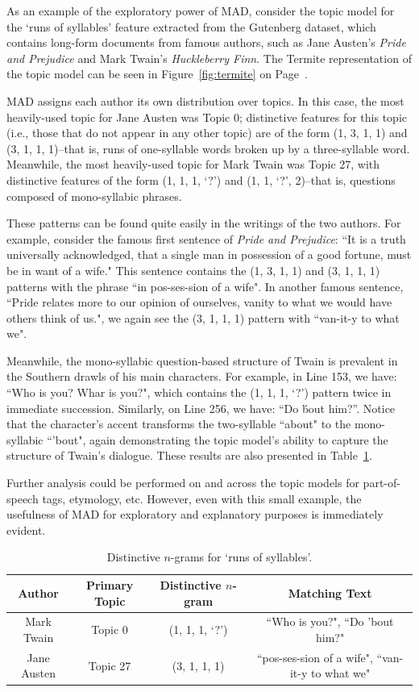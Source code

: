 \documentclass[14pt]{article} %
\theoremstyle{plain}
\theoremstyle{definition}
\theoremstyle{remark}
\begin{document}
As an example of the exploratory power of MAD, consider the topic model for the `runs of syllables' feature extracted from the Gutenberg dataset, which contains long-form documents from famous authors, such as Jane Austen's \textit{Pride and Prejudice} and Mark Twain's \textit{Huckleberry Finn}. The Termite representation of the topic model can be seen in Figure~\ref{fig:termite} on Page~\pageref{fig:termite}.

MAD assigns each author its own distribution over topics. In this case, the most heavily-used topic for Jane Austen was Topic 0; distinctive features for this topic (i.e., those that do not appear in any other topic) are of the form (1, 3, 1, 1) and (3, 1, 1, 1)--that is, runs of one-syllable words broken up by a three-syllable word. Meanwhile, the most heavily-used topic for Mark Twain was Topic 27, with distinctive features of the form (1, 1, 1, `?') and (1, 1, `?', 2)--that is, questions composed of mono-syllabic phrases.

These patterns can be found quite easily in the writings of the two authors. For example, consider the famous first sentence of \textit{Pride and Prejudice}: ``It is a truth universally acknowledged, that a single man in possession of a good fortune, must be in want of a wife." This sentence contains the (1, 3, 1, 1) and (3, 1, 1, 1) patterns with the phrase ``in pos-ses-sion of a wife". In another famous sentence, ``Pride relates more to our opinion of ourselves, vanity to what we would have others think of us.", we again see the (3, 1, 1, 1) pattern with ``van-it-y to what we".

Meanwhile, the mono-syllabic question-based structure of Twain is prevalent in the Southern drawls of his main characters. For example, in Line 153, we have: ``Who is you? Whar is you?", which contains the (1, 1, 1, `?') pattern twice in immediate succession. Similarly, on Line 256, we have: ``Do \'bout him?''. Notice that the character's accent transforms the two-syllable ``about" to the mono-syllabic ``'bout", again demonstrating the topic model's ability to capture the structure of Twain's dialogue. These results are also presented in Table~\ref{tab:distinctive_ngrams}.

Further analysis could be performed on and across the topic models for part-of-speech tags, etymology, etc. However, even with this small example, the usefulness of MAD for exploratory and explanatory purposes is immediately evident.

\begin{table}[ht] 
\centering
\begin{tabular}{ c | c | c | c }
  Author & Primary Topic & Distinctive $n$-gram & Matching Text \\
  \hline
  Mark Twain & Topic 0 & (1, 1, 1, `?') & ``Who is you?", ``Do 'bout him?" \\
  Jane Austen & Topic 27 & (3, 1, 1, 1) & ``pos-ses-sion of a wife", ``van-it-y to what we" \\
\end{tabular}
\caption{Distinctive $n$-grams for `runs of syllables'.}
\label{tab:distinctive_ngrams}
\end{table}
\end{document}
